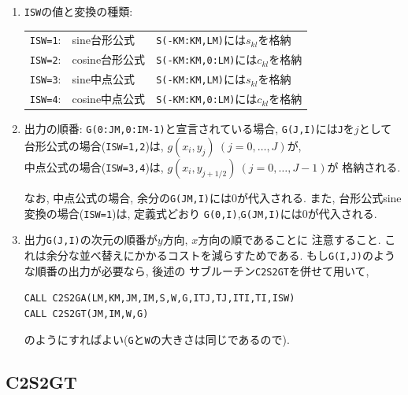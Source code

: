 \documentclass[a4j,fleqn]{jarticle}
\begin{document}
\begin{enumerate}
\begin{enumerate}
\item {\tt ISW}の値と変換の種類:

 \begin{tabular}{lll}
    {\tt ISW=1}: & sine台形公式   
        & {\tt S(-KM:KM,LM)}には$s_{kl}$を格納\\
    {\tt ISW=2}: & cosine台形公式 
        & {\tt S(-KM:KM,0:LM)}には$c_{kl}$を格納\\
    {\tt ISW=3}: & sine中点公式   
        & {\tt S(-KM:KM,LM)}には$s_{kl}$を格納\\
    {\tt ISW=4}: & cosine中点公式 
        & {\tt S(-KM:KM,0:LM)}には$c_{kl}$を格納
 \end{tabular}

\item 出力の順番: {\tt G(0:JM,0:IM-1)}と宣言されている場合, 
{\tt G(J,I)}には{\tt J}を$j$として\\
    台形公式の場合({\tt ISW=1,2})は, $g(x_i,y_j)\ (j=0,\ldots,J)$が,\\
    中点公式の場合({\tt ISW=3,4})は, $g(x_i,y_{j+1/2})\ (j=0,\ldots,J-1)$が
    格納される.

    なお, 中点公式の場合, 余分の{\tt G(JM,I)}には$0$が代入される.
    また, 台形公式sine変換の場合({\tt ISW=1})は, 定義式どおり
    {\tt G(0,I)},{\tt G(JM,I)}には$0$が代入される.

\item 出力{\tt G(J,I)}の次元の順番が$y$方向, $x$方向の順であることに
      注意すること. これは余分な並べ替えにかかるコストを減らすためである.
      もし{\tt G(I,J)}のような順番の出力が必要なら, 後述の
      サブルーチン{\tt C2S2GT}を併せて用いて,

        {\tt CALL C2S2GA(LM,KM,JM,IM,S,W,G,ITJ,TJ,ITI,TI,ISW)}\\
        {\tt CALL C2S2GT(JM,IM,W,G)}
	
      のようにすればよい({\tt G}と{\tt W}の大きさは同じであるので).

\end{enumerate}

\end{enumerate}

\subsection{C2S2GT}
\end{document}
